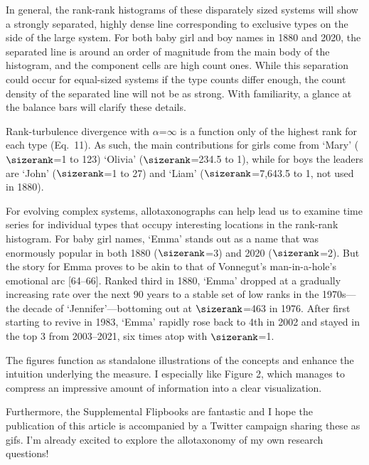 \begin{excerpt}
  In general, the rank-rank histograms of these disparately sized systems will show a strongly separated,
  highly dense line corresponding to exclusive types on the side of the large system.
  For both baby girl and boy names in 1880 and 2020,
  the separated line is around an order of magnitude from the main body of the histogram,
  and the component cells are high count ones.
  While this separation could occur for equal-sized systems if the type counts differ enough,
  the count density of the separated line will not be as strong.
  With familiarity, a glance at the balance bars will clarify these details.

  Rank-turbulence divergence with $\alpha$=$\infty$ 
  is a function only of the highest rank for each type
  (Eq.~11).
  As such, the main contributions for girls come from
  `Mary' ($\sizerank$=1 to 123)
  `Olivia' ($\sizerank$=234.5 to 1),
  while for boys
  the leaders are
  `John' ($\sizerank$=1 to 27)
  and
  `Liam' ($\sizerank$=7,643.5 to 1, not used in 1880).

  For evolving complex systems, allotaxonographs can help lead us to 
  examine time series for individual types that occupy interesting locations
  in the rank-rank histogram.
  For baby girl names, `Emma' stands out as a name that was
  enormously popular in both
  1880 ($\sizerank$=3)
  and
  2020 ($\sizerank$=2).
  But the story for Emma proves to be akin to that of Vonnegut's man-in-a-hole's
  emotional arc [64--66].
  Ranked third in 1880, `Emma' dropped at a gradually increasing rate over the next 90 years
  to a stable set of low ranks in the 1970s---the decade of `Jennifer'---bottoming out
  at $\sizerank$=463 in 1976.
  After first starting to revive in 1983,
  `Emma' rapidly rose back to 4th in 2002 and
  stayed in the top 3 from 2003--2021,
  six times atop with $\sizerank$=1.
\end{excerpt}

\begin{reviewercomment}
  The figures function as standalone illustrations of the concepts and
  enhance the intuition underlying the measure.  I especially like
  Figure 2, which manages to compress an impressive amount of
  information into a clear visualization.

  Furthermore, the
  Supplemental Flipbooks are fantastic and I hope the publication of
  this article is accompanied by a Twitter campaign sharing these as
  gifs. I'm already excited to explore the allotaxonomy of my own
  research questions!
\end{reviewercomment}

